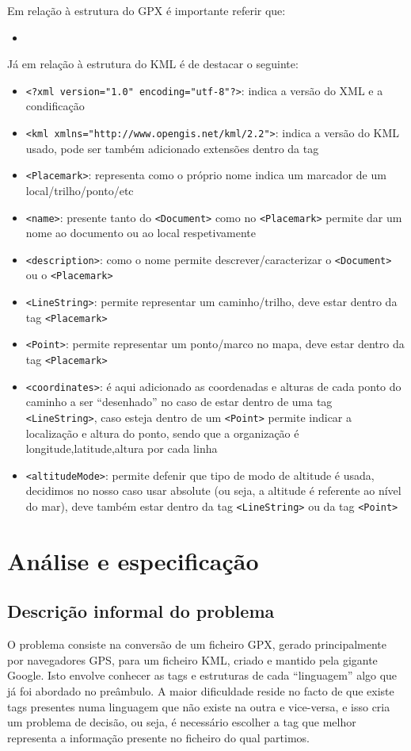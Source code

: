 \documentclass{llncs}
\begin{document}
Em relação à estrutura do GPX é importante referir que:
\begin{itemize}
    \item
\end{itemize}

Já em relação à estrutura do KML é de destacar o seguinte:
\begin{itemize}
    \item \verb|<?xml version="1.0" encoding="utf-8"?>|: indica a versão do XML e a condificação 
    \item \verb|<kml xmlns="http://www.opengis.net/kml/2.2">|: indica a versão do KML usado, pode ser também adicionado extensões dentro da tag
    \item \verb|<Placemark>|: representa como o próprio nome indica um marcador de um local/trilho/ponto/etc
    \item \verb|<name>|: presente tanto do \verb|<Document>| como no \verb|<Placemark>| permite dar um nome ao documento ou ao local respetivamente
    \item \verb|<description>|: como o nome permite descrever/caracterizar o \verb|<Document>| ou o \verb|<Placemark>|
    \item \verb|<LineString>|: permite representar um caminho/trilho, deve estar dentro da tag \verb|<Placemark>|
    \item \verb|<Point>|: permite representar um ponto/marco no mapa, deve estar dentro da tag \verb|<Placemark>|
    \item \verb|<coordinates>|: é aqui adicionado as coordenadas e alturas de cada ponto do caminho a ser ``desenhado'' no caso de estar dentro de uma tag \verb|<LineString>|, caso esteja dentro de um \verb|<Point>| permite indicar a localização e altura do ponto, sendo que a organização é longitude,latitude,altura por cada linha
    \item \verb|<altitudeMode>|: permite defenir que tipo de modo de altitude é usada, decidimos no nosso caso usar absolute (ou seja, a altitude é referente ao nível do mar), deve também estar dentro da tag \verb|<LineString>| ou da tag \verb|<Point>|
\end{itemize}

\section{Análise e especificação}

\subsection{Descrição informal do problema}
O problema consiste na conversão de um ficheiro GPX, gerado principalmente por navegadores GPS, para um ficheiro KML, criado e mantido pela gigante Google. Isto envolve conhecer as tags e estruturas de cada ``linguagem'' algo que já foi abordado no preâmbulo. A maior dificuldade reside no facto de que existe tags presentes numa linguagem que não existe na outra e vice-versa, e isso cria um problema de decisão, ou seja, é necessário escolher a tag que melhor representa a informação presente no ficheiro do qual partimos.
\end{document}
